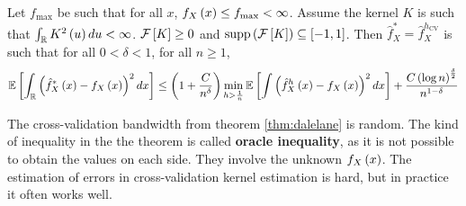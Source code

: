 \begin{theorem}
	\label{thm:dalelane}
	Let $f_{\max}$ be such that for all $x$, $f_X\left(x\right)\leq f_{\max} <\infty$. Assume the kernel $K$ is such that
	$\int_{\mathbb{R}} K^2\left(u\right)du<\infty$. $\mathcal{F}\left[K\right]\geq 0$ and $\mathrm{supp}\left(\mathcal{F}\left[K\right]\right)\subseteq [-1,1]$. Then $\hat{f}_X^\ast = \hat{f}_X^{h_{\mathrm{CV}}}$ is such that for all $0<\delta <1$, for all $n\geq 1$,
	\begin{equation*}
		\mathbb{E}\left[\int_{\mathbb{R}} \left(\hat{f}^\ast_X \left(x\right) - f_X\left(x\right)\right)^2dx\right] \leq \left(1+\frac{C}{n^\delta}\right) \min_{h>\frac{1}{n}} \mathbb{E}\left[\int \left(\hat{f}_X^h\left(x\right) - f_X\left(x\right)\right)^2 dx\right] + \frac{C\left(\log n\right)^{\frac{\delta}{2}}}{n^{1-\delta}}
	\end{equation*}
\end{theorem}
\begin{remark}
	The cross-validation bandwidth from theorem \ref{thm:dalelane} is random. The kind of inequality in the the theorem is called \textbf{oracle inequality}, as it is not possible to obtain the values on each side. They involve the unknown $f_X\left(x\right)$. The estimation of errors in cross-validation kernel estimation is hard, but in practice it often works well.
\end{remark}

